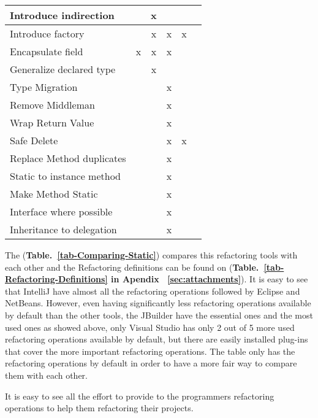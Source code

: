 \begin{table}[htbp]
\begin{tabular}{|l|c|c|c|c|c|}
Introduce indirection     &               & x       &          &          &          \\ \hline
Introduce factory         &               & x       & x        & x        &          \\ \hline
Encapsulate field         & x             & x       & x        &          &          \\ \hline
Generalize declared type  &               & x       &          &          &          \\ \hline
Type Migration            &               &         & x        &          &          \\ \hline
Remove Middleman          &               &         & x        &          &          \\ \hline
Wrap Return Value         &               &         & x        &          &          \\ \hline
Safe Delete               &               &         & x        & x        &          \\ \hline
Replace Method duplicates &               &         & x        &          &          \\ \hline
Static to instance method &               &         & x        &          &          \\ \hline
Make Method Static        &               &         & x        &          &          \\ \hline
Interface where possible  &               &         & x        &          &          \\ \hline
Inheritance to delegation &               &         & x        &          &          \\ \hline
\end{tabular}
\end{table}

The ({\bf Table.~\ref{tab-Comparing-Static}}) compares this refactoring tools with each other and the Refactoring definitions can be found on ({\bf Table.~\ref{tab-Refactoring-Definitions} in Apendix ~\ref{sec:attachments}}). 
It is easy to see that IntelliJ have almost all the refactoring operations followed by Eclipse and NetBeans.
However, even having significantly less refactoring operations available by default than the other tools, the JBuilder have the essential ones and the most used ones as showed above, only Visual Studio has only 2 out of 5 more used refactoring operations available by default, but there are easily installed plug-ins that cover the more important refactoring operations. The table only has the refactoring operations by default in order to have a more fair way to compare them with each other.

It is easy to see all the effort to provide to the programmers refactoring operations to help them refactoring their projects.

 